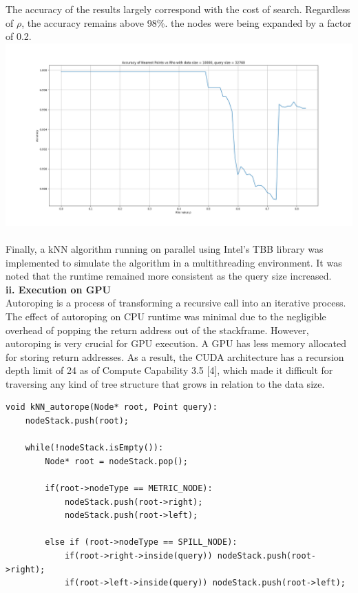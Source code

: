\documentclass{article}
\begin{document}
\\\\
The accuracy of the results largely correspond with the cost of search. Regardless of $\rho$, the accuracy remains above 98\%. the nodes were being expanded by a factor of 0.2.\\
\includegraphics[scale=0.38]{../sptree/visualization/chart_accu_rou}
~\\
Finally, a kNN algorithm running on parallel using Intel's TBB library was implemented to simulate the algorithm in a multithreading environment. It was noted that the runtime remained more consistent as the query size increased.\\
\newpage\noindent
\textbf{ii. Execution on GPU}\\
Autoroping is a process of transforming a recursive call into an iterative process. The effect of autoroping on CPU runtime was minimal due to the negligible overhead of popping the return address out of the stackframe. However, autoroping is very crucial for GPU execution. A GPU has less memory allocated for storing return addresses. As a result, the CUDA architecture has a recursion depth limit of 24 as of Compute Capability 3.5 [4], which made it difficult for traversing any kind of tree structure that grows in relation to the data size.\\
\small
\begin{lstlisting}
void kNN_autorope(Node* root, Point query):
    nodeStack.push(root);
    
    while(!nodeStack.isEmpty()):
        Node* root = nodeStack.pop();
        
       	if(root->nodeType == METRIC_NODE):
            nodeStack.push(root->right);
            nodeStack.push(root->left);
            
        else if (root->nodeType == SPILL_NODE):
            if(root->right->inside(query)) nodeStack.push(root->right);
            if(root->left->inside(query)) nodeStack.push(root->left);
\end{lstlisting}
\end{document}
